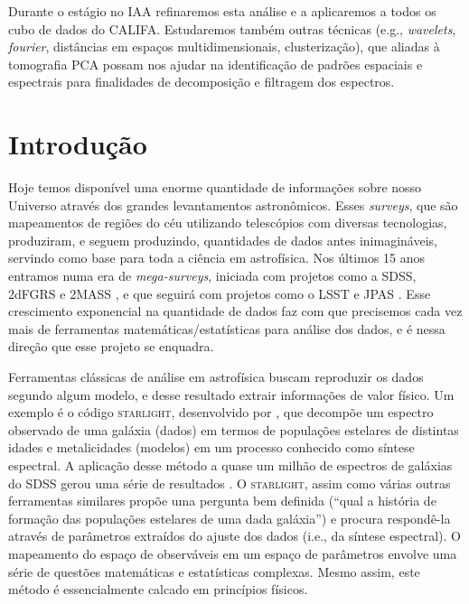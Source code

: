 \documentclass[a4paper,12pt]{article}
\def\starlight{\textsc{starlight}\xspace}      %
\def\SDSS{SDSS\xspace}           %
\begin{document}
Durante o estágio no IAA refinaremos esta análise e a aplicaremos a todos os cubo de dados do CALIFA. Estudaremos também outras técnicas (e.g., {\em
wavelets}, {\em fourier}, distâncias em espaços multidimensionais, clusterização), que aliadas à tomografia PCA possam nos ajudar na identificação de
padrões espaciais e espectrais para finalidades de decomposição e filtragem dos espectros.

\section{Introdução}
\vspace{0.3cm}
Hoje temos disponível uma enorme quantidade de informações sobre nosso Universo através dos grandes levantamentos astronômicos. Esses {\em surveys},
que são mapeamentos de regiões do céu utilizando telescópios com diversas tecnologias, produziram, e seguem produzindo, quantidades de dados antes
inimagináveis, servindo como base para toda a ciência em astrofísica. Nos últimos 15 anos entramos numa era de {\em mega-surveys}, iniciada com
projetos como a \SDSS \citep{York2000}, 2dFGRS \citep{Colless1999} e 2MASS \citep{Skrutskie2006}, e que seguirá com projetos como o LSST
\citep{Ivezic2008} e JPAS \citep{JPAS2014}. Esse crescimento exponencial na quantidade de dados faz com que precisemos cada vez mais de ferramentas
matemáticas/estatísticas para análise dos dados, e é nessa direção que esse projeto se enquadra.
	
Ferramentas clássicas de análise em astrofísica buscam reproduzir os dados segundo algum modelo, e desse resultado extrair informações de valor
físico. Um exemplo é o código \starlight, desenvolvido por \citet{CidFernandes2005}, que decompõe um espectro observado de uma galáxia (dados) em
termos de populações estelares de distintas idades e metalicidades (modelos) em um processo conhecido como síntese espectral. A aplicação desse método
a quase um milhão de espectros de galáxias do \SDSS gerou uma série de resultados \citep[e.g., ][]{Asari2007, Asari2009, CidFernandes2007,
Mateus2007}. O \starlight, assim como várias outras ferramentas similares \citep{Panter2003, Gallazzi2005, Ocvirk2006} propõe uma pergunta bem
definida (``qual a história de formação das populações estelares de uma dada galáxia'') e procura respondê-la através de parâmetros extraídos do
ajuste dos dados (i.e., da síntese espectral). O mapeamento do espaço de observáveis em um espaço de parâmetros envolve uma série de questões
matemáticas e estatísticas complexas. Mesmo assim, este método é essencialmente calcado em princípios físicos.
\end{document}

